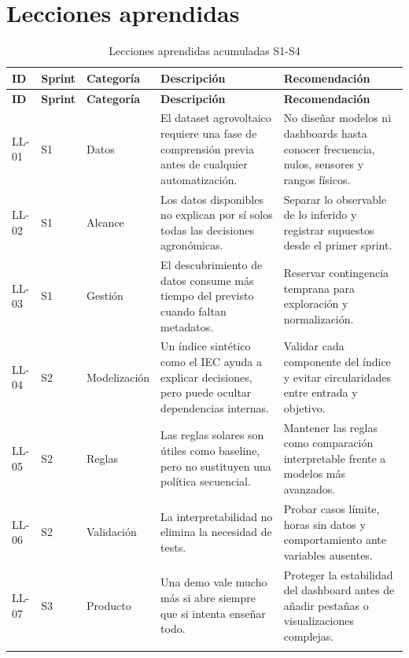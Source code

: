 \documentclass[11pt,a4paper]{article}
\begin{document}
\newpage

\section{Lecciones aprendidas}

\begin{longtable}{p{}p{}p{}p{}p{}}
\caption{Lecciones aprendidas acumuladas S1-S4}\\
\toprule
\textbf{ID} & \textbf{Sprint} & \textbf{Categoría} & \textbf{Descripción} & \textbf{Recomendación} \\
\midrule
\endfirsthead
\toprule
\textbf{ID} & \textbf{Sprint} & \textbf{Categoría} & \textbf{Descripción} & \textbf{Recomendación} \\
\midrule
\endhead
LL-01 & S1 & Datos & El dataset agrovoltaico requiere una fase de comprensión previa antes de cualquier automatización. & No diseñar modelos ni dashboards hasta conocer frecuencia, nulos, sensores y rangos físicos. \\
\addlinespace
LL-02 & S1 & Alcance & Los datos disponibles no explican por sí solos todas las decisiones agronómicas. & Separar lo observable de lo inferido y registrar supuestos desde el primer sprint. \\
\addlinespace
LL-03 & S1 & Gestión & El descubrimiento de datos consume más tiempo del previsto cuando faltan metadatos. & Reservar contingencia temprana para exploración y normalización. \\
\addlinespace
LL-04 & S2 & Modelización & Un índice sintético como el IEC ayuda a explicar decisiones, pero puede ocultar dependencias internas. & Validar cada componente del índice y evitar circularidades entre entrada y objetivo. \\
\addlinespace
LL-05 & S2 & Reglas & Las reglas solares son útiles como baseline, pero no sustituyen una política secuencial. & Mantener las reglas como comparación interpretable frente a modelos más avanzados. \\
\addlinespace
LL-06 & S2 & Validación & La interpretabilidad no elimina la necesidad de tests. & Probar casos límite, horas sin datos y comportamiento ante variables ausentes. \\
\addlinespace
LL-07 & S3 & Producto & Una demo vale mucho más si abre siempre que si intenta enseñar todo. & Proteger la estabilidad del dashboard antes de añadir pestañas o visualizaciones complejas. \\
\addlinespace

\end{longtable}
\end{document}
